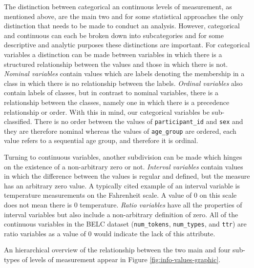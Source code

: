 \documentclass[
]{article}
\begin{document}
The distinction between categorical an continuous levels of measurement, as mentioned above, are the main two and for some statistical approaches the only distinction that needs to be made to conduct an analysis. However, categorical and continuous can each be broken down into subcategories and for some descriptive and analytic purposes these distinctions are important. For categorical variables a distinction can be made between variables in which there is a structured relationship between the values and those in which there is not. \emph{Nominal variables} contain values which are labels denoting the membership in a class in which there is no relationship between the labels. \emph{Ordinal variables} also contain labels of classes, but in contrast to nominal variables, there is a relationship between the classes, namely one in which there is a precedence relationship or order. With this in mind, our categorical variables be sub-classified. There is no order between the values of \texttt{participant\_id} and \texttt{sex} and they are therefore nominal whereas the values of \texttt{age\_group} are ordered, each value refers to a sequential age group, and therefore it is ordinal.

Turning to continuous variables, another subdivision can be made which hinges on the existence of a non-arbitrary zero or not. \emph{Interval variables} contain values in which the difference between the values is regular and defined, but the measure has an arbitrary zero value. A typically cited example of an interval variable is temperature measurements on the Fahrenheit scale. A value of 0 on this scale does not mean there is 0 temperature. \emph{Ratio variables} have all the properties of interval variables but also include a non-arbitrary definition of zero. All of the continuous variables in the BELC dataset (\texttt{num\_tokens}, \texttt{num\_types}, and \texttt{ttr}) are ratio variables as a value of 0 would indicate the lack of this attribute.

An hierarchical overview of the relationship between the two main and four sub-types of levels of measurement appear in Figure \ref{fig:info-values-graphic}.
\end{document}
